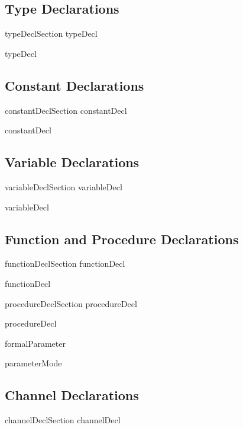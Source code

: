 \subsection{Type Declarations}
\bgrm
typeDeclSection \Derive
   typeDecl      
\egrm

\bgrm
typeDecl \Derive
\egrm

\subsection{Constant Declarations}
\bgrm
constantDeclSection \Derive
   constantDecl  
\egrm

\bgrm
constantDecl \Derive
   \trm{:} 
\egrm

\subsection{Variable Declarations}
\bgrm
variableDeclSection \Derive
   variableDecl 
\egrm

\bgrm
variableDecl \Derive
   \trm{:} 
\egrm

\subsection{Function and Procedure Declarations}
\bgrm
functionDeclSection \Derive
   functionDecl  
\egrm

\bgrm
functionDecl \Derive
   \trm{(}  \trm{)} 
    \trm{:} 
\egrm

\bgrm
procedureDeclSection \Derive
   procedureDecl  
\egrm

\bgrm
procedureDecl \Derive
   \trm{(}  \trm{)} 
\egrm

\bgrm
formalParameter \Derive
   
\egrm

\bgrm
parameterMode \Derive
\alt {}
\alt {}                
\egrm

\subsection{Channel Declarations}
\bgrm
channelDeclSection \Derive
   channelDecl  
\egrm


